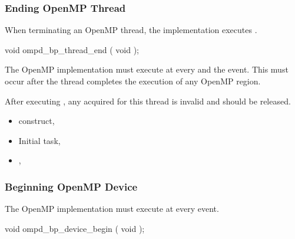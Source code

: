 \subsubsection{Ending OpenMP Thread}
\label{subsubsec:ompd_bp_thread_end}

\summary

When terminating an OpenMP thread, the implementation 
executes .

\format
\begin{cspecific}
\begin{ompSyntax}
void ompd_bp_thread_end ( void );
\end{ompSyntax}
\end{cspecific}


\descr

The OpenMP implementation must execute 
 at every  and the  event.
This must occur after the thread completes the execution of any OpenMP region.

After 
executing , any  acquired for this thread 
is invalid and should be released.


\crossreferences
\begin{itemize}
\item
   construct, 
\item
  Initial task, 
\item
  , 
\end{itemize}






\subsubsection{Beginning OpenMP Device}
\label{subsubsec:ompd_bp_device_begin}

\summary
The OpenMP implementation must execute 
 at every  event.


\format
\begin{cspecific}
\begin{ompSyntax}
void ompd_bp_device_begin ( void );
\end{ompSyntax}
\end{cspecific}


